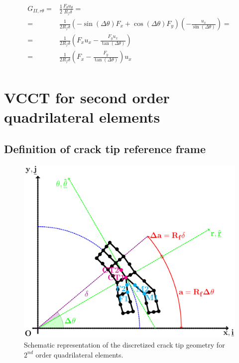 \documentclass[a4paper]{jpconf}
\begin{document}
\begin{equation}
\begin{split}
G_{II,r\theta} = &\frac{1}{2}\frac{F_{\theta}u_{\theta}}{R_{f}\delta}=\\
= &\frac{1}{2R_{f}\delta}\left(-\sin\left(\Delta\theta\right) F_{x}+\cos\left(\Delta\theta\right)F_{y}\right)\left(-\frac{u_{x}}{\sin\left(\Delta\theta\right)}\right)=\\
= &\frac{1}{2R_{f}\delta}\left( F_{x}u_{x}-\frac{F_{y}u_{x}}{\tan\left(\Delta\theta\right)}\right)\\
= &\frac{1}{2R_{f}\delta}\left( F_{x}-\frac{F_{y}}{\tan\left(\Delta\theta\right)}\right)u_{x}\\
\end{split}
\end{equation}

\clearpage


\section{VCCT for second order quadrilateral elements}

\subsection{Definition of crack tip reference frame}

\begin{figure}[!h]
\includegraphics[width=\textwidth]{VCCT-quadratic.pdf}
\caption{Schematic representation of the discretized crack tip geometry for $2^{nd}$ order quadrilateral elements.}
\end{figure}
\end{document}
